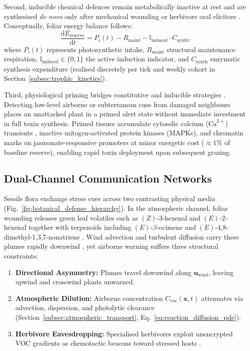 Second, inducible chemical defences remain metabolically inactive at rest and are synthesised \textit{de novo} only after mechanical wounding or herbivore oral elicitors \cite{gatehouse2002plant}. Conceptually, foliar energy balance follows:
\begin{equation}
  \frac{\mathrm{d}E_{\text{reserve}}}{\mathrm{d}t} = P_i(t) - R_{\text{maint}} - \mathbb{I}_{\text{induced}} \cdot C_{\text{synth}},
\end{equation}
where $P_i(t)$ represents photosynthetic intake, $R_{\text{maint}}$ structural maintenance respiration, $\mathbb{I}_{\text{induced}} \in \{0, 1\}$ the active induction indicator, and $C_{\text{synth}}$ enzymatic synthesis expenditure (realised discretely per tick and weekly cohort in Section~\ref{subsec:trophic_kinetics}).

Third, physiological priming bridges constitutive and inducible strategies \cite{farmer2001surface, baldwin2006volatile, babikova2013underground, arimura2025cracking}. Detecting low-level airborne or subterranean cues from damaged neighbours places an unattacked plant in a primed alert state without immediate investment in full toxin synthesis. Primed tissues accumulate cytosolic calcium ($\text{Ca}^{2+}$) transients \cite{aratani2023green}, inactive mitogen-activated protein kinases (MAPKs), and chromatin marks on jasmonate-responsive promoters \cite{gatehouse2002plant, arimura2025cracking} at minor energetic cost ($\approx 1\%$ of baseline reserve), enabling rapid toxin deployment upon subsequent grazing.

\subsection{Dual-Channel Communication Networks}
\label{subsec:communication_networks}

Sessile flora exchange stress cues across two contrasting physical media (Fig.~\ref{fig:botanical_defense_hierarchy}). In the atmospheric channel, foliar wounding releases green leaf volatiles such as $(Z)$-3-hexenal and $(E)$-2-hexenal together with terpenoids including $(E)$-$\beta$-ocimene and $(E)$-4,8-dimethyl-1,3,7-nonatriene \cite{farmer2001surface, baldwin2006volatile, aratani2023green}. Wind advection and turbulent diffusion carry these plumes rapidly downwind \cite{okubo2001diffusion}, yet airborne warning suffers three structural constraints:
\begin{enumerate}
  \item \textbf{Directional Asymmetry:} Plumes travel downwind along $\mathbf{u}_{\text{wind}}$, leaving upwind and crosswind plants unwarned.
  \item \textbf{Atmospheric Dilution:} Airborne concentration $C_{\text{voc}}(\mathbf{x}, t)$ attenuates via advection, dispersion, and photolytic clearance (Section~\ref{subsec:atmospheric_transport}, Eq.~\ref{eq:reaction_diffusion_pde}).
  \item \textbf{Herbivore Eavesdropping:} Specialised herbivores exploit unencrypted VOC gradients as chemotactic beacons toward stressed hosts \cite{baldwin2006volatile, arimura2025cracking}.
\end{enumerate}


